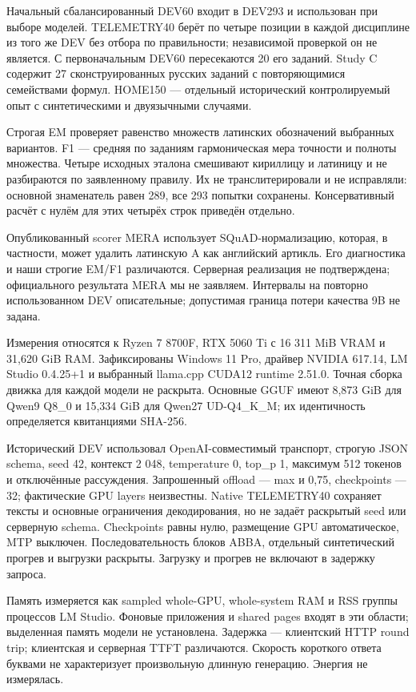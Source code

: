 \documentclass[14pt,a4paper]{extarticle}
\begin{document}
Начальный сбалансированный DEV60 входит в DEV293 и использован при выборе моделей. TELEMETRY40 берёт по четыре позиции в каждой дисциплине из того же DEV без отбора по правильности; независимой проверкой он не является. С первоначальным DEV60 пересекаются 20 его заданий. Study C содержит 27 сконструированных русских заданий с повторяющимися семействами формул. HOME150 --- отдельный исторический контролируемый опыт с синтетическими и двуязычными случаями.


Строгая EM проверяет равенство множеств латинских обозначений выбранных вариантов. F1 --- средняя по заданиям гармоническая мера точности и полноты множества. Четыре исходных эталона смешивают кириллицу и латиницу и не разбираются по заявленному правилу. Их не транслитерировали и не исправляли: основной знаменатель равен 289, все 293 попытки сохранены. Консервативный расчёт с нулём для этих четырёх строк приведён отдельно.


Опубликованный scorer MERA использует SQuAD-нормализацию, которая, в частности, может удалить латинскую A как английский артикль. Его диагностика и наши строгие EM/F1 различаются. Серверная реализация не подтверждена; официального результата MERA мы не заявляем. Интервалы на повторно использованном DEV описательные; допустимая граница потери качества 9B не задана.


Измерения относятся к Ryzen 7 8700F, RTX 5060 Ti с 16 311 MiB VRAM и 31,620 GiB RAM. Зафиксированы Windows 11 Pro, драйвер NVIDIA 617.14, LM Studio 0.4.25+1 и выбранный llama.cpp CUDA12 runtime 2.51.0. Точная сборка движка для каждой модели не раскрыта. Основные GGUF имеют 8,873 GiB для Qwen9 Q8\_0 и 15,334 GiB для Qwen27 UD-Q4\_K\_M; их идентичность определяется квитанциями SHA-256.


Исторический DEV использовал OpenAI-совместимый транспорт, строгую JSON schema, seed 42, контекст 2 048, temperature 0, top\_p 1, максимум 512 токенов и отключённые рассуждения. Запрошенный offload --- max и 0,75, checkpoints --- 32; фактические GPU layers неизвестны. Native TELEMETRY40 сохраняет тексты и основные ограничения декодирования, но не задаёт раскрытый seed или серверную schema. Checkpoints равны нулю, размещение GPU автоматическое, MTP выключен. Последовательность блоков ABBA, отдельный синтетический прогрев и выгрузки раскрыты. Загрузку и прогрев не включают в задержку запроса.


Память измеряется как sampled whole-GPU, whole-system RAM и RSS группы процессов LM Studio. Фоновые приложения и shared pages входят в эти области; выделенная память модели не установлена. Задержка --- клиентский HTTP round trip; клиентская и серверная TTFT различаются. Скорость короткого ответа буквами не характеризует произвольную длинную генерацию. Энергия не измерялась.
\end{document}
